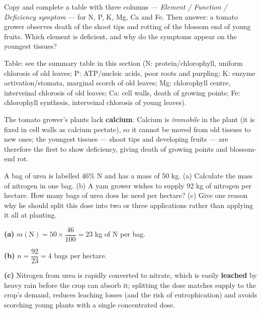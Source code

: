 \documentclass[11pt]{article}
\begin{document}
\begin{exercice}
Copy and complete a table with three columns --- \emph{Element / Function / Deficiency symptom} --- for N, P, K, Mg, Ca and Fe. Then answer: a tomato grower observes death of the shoot tips and rotting of the blossom end of young fruits. Which element is deficient, and why do the symptoms appear on the youngest tissues?
\end{exercice}

\begin{corrige}[Exercise 1]
Table: see the summary table in this section (N: protein/chlorophyll, uniform chlorosis of old leaves; P: ATP/nucleic acids, poor roots and purpling; K: enzyme activation/stomata, marginal scorch of old leaves; Mg: chlorophyll centre, interveinal chlorosis of old leaves; Ca: cell walls, death of growing points; Fe: chlorophyll synthesis, interveinal chlorosis of young leaves).

The tomato grower's plants lack \textbf{calcium}. Calcium is \emph{immobile} in the plant (it is fixed in cell walls as calcium pectate), so it cannot be moved from old tissues to new ones; the youngest tissues --- shoot tips and developing fruits --- are therefore the first to show deficiency, giving death of growing points and blossom-end rot.
\end{corrige}

\begin{exercice}
A bag of urea is labelled 46\% N and has a mass of 50 kg. (a) Calculate the mass of nitrogen in one bag. (b) A yam grower wishes to supply 92 kg of nitrogen per hectare. How many bags of urea does he need per hectare? (c) Give one reason why he should split this dose into two or three applications rather than applying it all at planting.
\end{exercice}

\begin{corrige}[Exercise 2]
\textbf{(a)} $m(\mathrm{N}) = 50 \times \dfrac{46}{100} = 23$ kg of N per bag.

\textbf{(b)} $n = \dfrac{92}{23} = 4$ bags per hectare.

\textbf{(c)} Nitrogen from urea is rapidly converted to nitrate, which is easily \textbf{leached} by heavy rain before the crop can absorb it; splitting the dose matches supply to the crop's demand, reduces leaching losses (and the risk of eutrophication) and avoids scorching young plants with a single concentrated dose.
\end{corrige}
\end{document}
